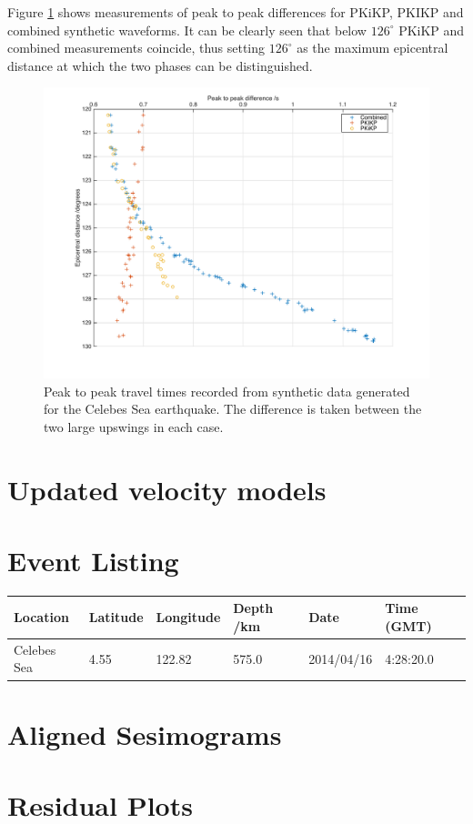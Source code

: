 \documentclass[11pt,a4paper]{article}
\begin{document}
Figure \ref{fig:Min distance} shows measurements of peak to peak differences for PKiKP, PKIKP and combined synthetic waveforms. It can be clearly seen that below $126^{\circ}$ PKiKP and combined measurements coincide, thus setting $126^{\circ}$ as the maximum epicentral distance at which the two phases can be distinguished.

\begin{figure}
	\centering
	\includegraphics[width=\textwidth]{figures/min_distance}
	\caption{Peak to peak travel times recorded from synthetic data generated for the Celebes Sea earthquake. The difference is taken between the two large upswings in each case.}
	\label{fig:Min distance}
\end{figure}

\section{Updated velocity models}
\label{sec:Models}

\appendix
\section{Event Listing}
\label{App:Event listing}
\begin{tabular}{| l | l | l | l | l | l |}
	\hline Location		& Latitude	& Longitude	& Depth /km	& Date		& Time (GMT) \\
	\hline Celebes Sea	& 4.55	& 122.82		& 575.0		& 2014/04/16	& 4:28:20.0 \\ 
	\hline
\end{tabular}

\section{Aligned Sesimograms}

\section{Residual Plots}



\end{document}

